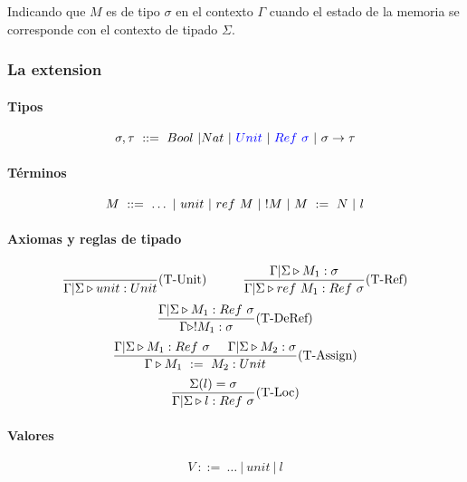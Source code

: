 Indicando que $M$ es de tipo $\sigma$ en el contexto $\Gamma$ cuando el estado de la memoria se corresponde con el contexto de tipado $\Sigma$.

\subsubsection{La extension}

\paragraph{Tipos}
$$\sigma, \tau ~::=~ Bool~|Nat~|~\color{blue}Unit\color{black}~|~\color{blue}Ref~\sigma\color{black}~|~\sigma\to\tau$$

\paragraph{Términos}

$$ M~::=~ \dots~|~unit~|~ref~M~|~!M~|~M~:=~N~|~    l$$

\paragraph{Axiomas y reglas de tipado}
\begin{equation*}
	\frac{}{\Gamma|\Sigma\triangleright unit : Unit}(\text{T-Unit})\hspace*{1cm}\frac{\Gamma|\Sigma\triangleright M_1 : \sigma}{\Gamma|\Sigma\triangleright ref~M_1 : Ref~\sigma}(\text{T-Ref})
\end{equation*}
\vspace*{5mm}
\begin{equation*}
	\frac{\Gamma|\Sigma\triangleright M_1 : Ref~\sigma}{\Gamma\triangleright !M_1 : \sigma}(\text{T-DeRef})
\end{equation*}
\vspace*{5mm}
\begin{equation*}
	\frac{\Gamma|\Sigma\triangleright M_1 : Ref~\sigma\hspace*{5mm}\Gamma|\Sigma\triangleright M_2 : \sigma}{\Gamma\triangleright M_1~:=~M_2 : Unit}(\text{T-Assign})
\end{equation*}
\vspace*{5mm}
\begin{equation*}
	\frac{\Sigma(l) = \sigma}{\Gamma|\Sigma\triangleright l : Ref~\sigma}(\text{T-Loc})
\end{equation*}

\paragraph{Valores}
$$V~::=~\dots~|~unit~|~l$$

